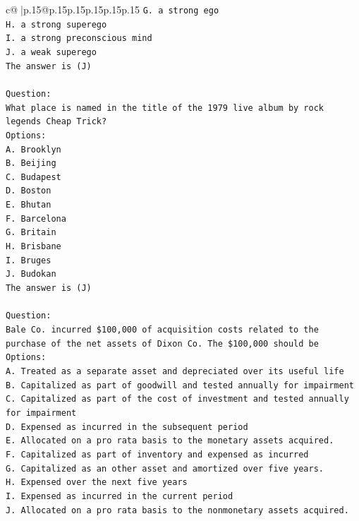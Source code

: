 \documentclass{article}
\begin{document}
{\begin{supertabular}{c@{$\;$}|p{.15\linewidth}@{}p{.15\linewidth}p{.15\linewidth}p{.15\linewidth}p{.15\linewidth}p{.15\linewidth}}
{{{\texttt{G. a strong ego} \\
\texttt{H. a strong superego} \\
\texttt{I. a strong preconscious mind} \\
\texttt{J. a weak superego} \\
\texttt{The answer is (J)} \\
\\ 
\texttt{Question:} \\
\texttt{What place is named in the title of the 1979 live album by rock legends Cheap Trick?} \\
\texttt{Options:} \\
\texttt{A. Brooklyn} \\
\texttt{B. Beijing} \\
\texttt{C. Budapest} \\
\texttt{D. Boston} \\
\texttt{E. Bhutan} \\
\texttt{F. Barcelona} \\
\texttt{G. Britain} \\
\texttt{H. Brisbane} \\
\texttt{I. Bruges} \\
\texttt{J. Budokan} \\
\texttt{The answer is (J)} \\
\\ 
\texttt{Question:} \\
\texttt{Bale Co. incurred \$100,000 of acquisition costs related to the purchase of the net assets of Dixon Co. The \$100,000 should be} \\
\texttt{Options:} \\
\texttt{A. Treated as a separate asset and depreciated over its useful life} \\
\texttt{B. Capitalized as part of goodwill and tested annually for impairment} \\
\texttt{C. Capitalized as part of the cost of investment and tested annually for impairment} \\
\texttt{D. Expensed as incurred in the subsequent period} \\
\texttt{E. Allocated on a pro rata basis to the monetary assets acquired.} \\
\texttt{F. Capitalized as part of inventory and expensed as incurred} \\
\texttt{G. Capitalized as an other asset and amortized over five years.} \\
\texttt{H. Expensed over the next five years} \\
\texttt{I. Expensed as incurred in the current period} \\
\texttt{J. Allocated on a pro rata basis to the nonmonetary assets acquired.} \\
            }
        }
    }
     \\ \\


\end{supertabular}}
\end{document}

